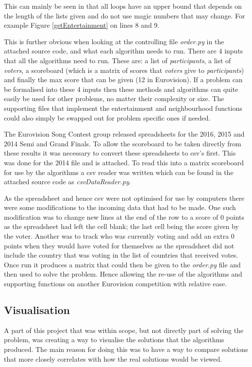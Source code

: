\documentclass[12pt]{report}
\begin{document}
This can mainly be seen in that all loops have an upper bound that depends on the length of the lists given and do not use magic numbers that may change. For example Figure \ref{getEntertainment} on lines 8 and 9. 

This is further obvious when looking at the controlling file \textit{order.py} in the attached source code, and what each algorithm needs to run. There are 4 inputs that all the algorithms need to run. These are: a list of \textit{participants}, a list of \textit{voters}, a scoreboard (which is a matrix of scores that \textit{voters} give to \textit{participants}) and finally the max score that can be given (12 in Eurovision). If a problem can be formalised into these 4 inputs then these methods and algorithms can quite easily be used for other problems, no matter their complexity or size. The supporting files that implement the entertainment and neighbourhood functions could also simply be swapped out for problem specific ones if needed.

The Eurovision Song Contest group released spreadsheets for the 2016, 2015 and 2014 Semi and Grand Finals. To allow the scoreboard to be taken directly from these results it was necessary to convert these spreadsheets to csv's first. This was done for the 2014 file and is attached. To read this into a matrix scoreboard for use by the algorithms a csv reader was written which can be found in the attached source code as \textit{csvDataReader.py}.

As the spreadsheet and hence csv were not optimised for use by computers there were some modifications to the incoming data that had to be made. One such modification was to change new lines at the end of the row to a score of 0 points as the spreadsheet had left the cell blank; the last cell being the score given by the voter. Another was to track who was currently voting and add an extra 0 points when they would have voted for themselves as the spreadsheet did not include the country that was voting in the list of countries that received votes. Once run it produces a matrix that could then be given to the \textit{order.py} file and then used to solve the problem. Hence allowing the re-use of the algorithms and supporting functions on another Eurovision competition with relative ease.

\subsection{Visualisation}\label{Imp-Vis}
A part of this project that was within scope, but not directly part of solving the problem, was creating a way to visualise the solutions that the algorithms produced. The main reason for doing this was to have a way to compare solutions that more closely correlates with how the real solutions would be viewed.
\end{document}
